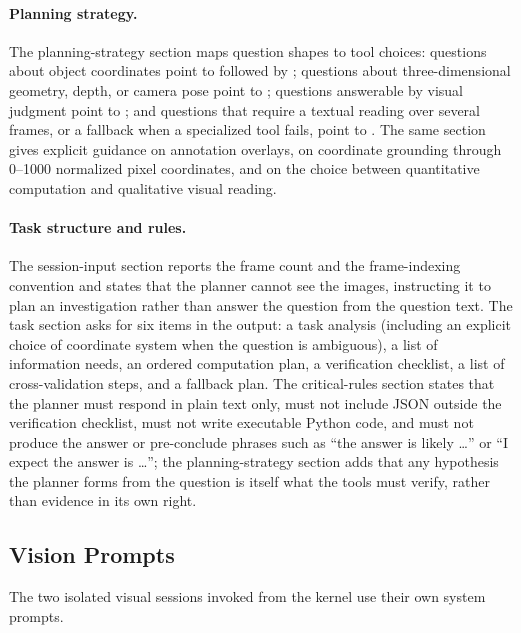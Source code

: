 \paragraph{Planning strategy.}
The planning-strategy section maps question shapes to tool choices: questions about object coordinates point to  followed by ; questions about three-dimensional geometry, depth, or camera pose point to ; questions answerable by visual judgment point to ; and questions that require a textual reading over several frames, or a fallback when a specialized tool fails, point to . The same section gives explicit guidance on annotation overlays, on coordinate grounding through 0--1000 normalized pixel coordinates, and on the choice between quantitative computation and qualitative visual reading.

\paragraph{Task structure and rules.}
The session-input section reports the frame count and the frame-indexing convention and states that the planner cannot see the images, instructing it to plan an investigation rather than answer the question from the question text. The task section asks for six items in the output: a task analysis (including an explicit choice of coordinate system when the question is ambiguous), a list of information needs, an ordered computation plan, a verification checklist, a list of cross-validation steps, and a fallback plan. The critical-rules section states that the planner must respond in plain text only, must not include JSON outside the verification checklist, must not write executable Python code, and must not produce the answer or pre-conclude phrases such as ``the answer is likely \dots'' or ``I expect the answer is \dots''; the planning-strategy section adds that any hypothesis the planner forms from the question is itself what the tools must verify, rather than evidence in its own right.

\subsection{Vision Prompts}
\label{app:prompt_vision}
The two isolated visual sessions invoked from the kernel use their own system prompts.

